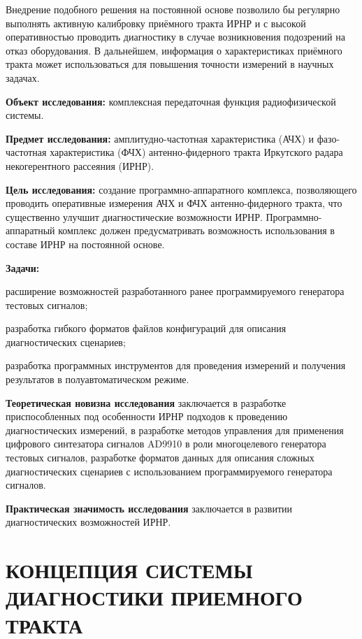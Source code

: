\documentclass{report}
\begin{document}
Внедрение подобного решения на постоянной основе позволило бы регулярно выполнять активную калибровку приёмного тракта ИРНР и с высокой оперативностью проводить диагностику в случае возникновения подозрений на отказ оборудования. В дальнейшем, информация о характеристиках приёмного тракта может использоваться для повышения точности измерений в научных задачах.

{\bf Объект исследования:} комплексная передаточная функция радиофизической системы.

{\bf Предмет исследования:} амплитудно-частотная характеристика (АЧХ) и фазо-частотная характеристика (ФЧХ) антенно-фидерного тракта Иркутского радара некогерентного рассеяния (ИРНР).

{\bf Цель исследования:} создание программно-аппаратного комплекса, позволяющего проводить оперативные измерения АЧХ и ФЧХ антенно-фидерного тракта, что существенно улучшит диагностические возможности ИРНР. Программно-аппаратный комплекс должен предусматривать возможность использования в составе ИРНР на постоянной основе.

{\bf Задачи:}
\begin{enumarabic}
\item расширение возможностей разработанного ранее программируемого генератора тестовых сигналов;
\item разработка гибкого форматов файлов конфигураций для описания диагностических сценариев;
\item разработка программных инструментов для проведения измерений и получения результатов в полуавтоматическом режиме.
\end{enumarabic}


{\bf Теоретическая новизна исследования} заключается в разработке приспособленных под особенности ИРНР подходов к проведению диагностических измерений, в разработке методов управления для применения цифрового синтезатора сигналов AD9910 в роли многоцелевого генератора тестовых сигналов, разработке форматов данных для описания сложных диагностических сценариев с использованием программируемого генератора сигналов.

{\bf Практическая значимость исследования} заключается в развитии диагностических возможностей ИРНР.

% 
\setcounter{section}{0} %
\setcounter{subsection}{0} %
\setcounter{equation}{0} %

\chapter{КОНЦЕПЦИЯ СИСТЕМЫ ДИАГНОСТИКИ ПРИЕМНОГО ТРАКТА}
\end{document}
